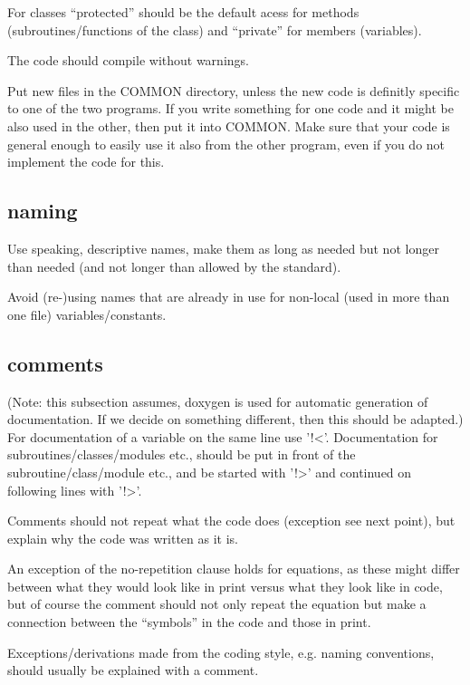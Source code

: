 \documentclass{article}
\begin{document}
For classes ``protected'' should be the default acess for methods
(subroutines/functions of the class) and ``private'' for members
(variables).

The code should compile without warnings.

Put new files in the COMMON directory, unless the new code is definitly
specific to one of the two programs.
If you write something for one code and it might be also used in the
other, then put it into COMMON. Make sure that your code is general
enough to easily use it also from the other program, even if you do not
implement the code for this.

\subsection{naming}
Use speaking, descriptive names, make them as long as needed but not
longer than needed (and not longer than allowed by the standard).

Avoid (re-)using names that are already in use for non-local (used in
more than one file) variables/constants.

\subsection{comments}
(Note: this subsection assumes, doxygen is used for automatic generation
of documentation. If we decide on something different, then this should
be adapted.)\\
For documentation of a variable on the same line use '!<'.
Documentation for subroutines/classes/modules etc., should be put in
front of the subroutine/class/module etc., and be started with '!>' and
continued on following lines with '!>'.

Comments should not repeat what the code does (exception see next
point), but explain why the code was written as it is.

An exception of the no-repetition clause holds for equations, as these
might differ between what they would look like in print versus what they
look like in code, but of course the comment should not only repeat the
equation but make a connection between the ``symbols'' in the code and
those in print.

Exceptions/derivations made from the coding style, e.g. naming
conventions, should usually be explained with a comment.
\end{document}
